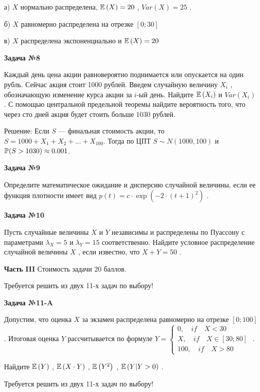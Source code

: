 \documentclass[12pt, a4paper]{article}\usepackage[]{graphicx}\usepackage[]{color}
\begin{document}
	а)  $X$  нормально распределена,  $\E\left(X\right)=20$ ,  $Var\left(X\right)=25$ .

	б)  $X$  равномерно распределена на отрезке  $\left[0;30\right]$

	в)  $X$  распределена экспоненциально и  $\E\left(X\right)=20$

	{\bf Задача №8}

	Каждый день цена акции равновероятно поднимается или опускается на один рубль. Сейчас акция стоит 1000 рублей. Введем случайную величину  $X_{i} $ , обозначающую изменение курса акции за  $i$-ый день. Найдите  $\E\left(X_{i} \right)$  и  $Var\left(X_{i} \right)$ . С помощью центральной предельной теоремы найдите вероятность того, что через сто дней акция будет стоить больше 1030 рублей.


	Решение: Если $S$ — финальная стоимость акции, то $S=1000+X_1+X_2+\ldots+X_{100}$. Тогда по ЦПТ $S\sim N(1000,100)$ и $\P(S>1030)\approx 0.001$.

	{\bf Задача №9}

	Определите математическое ожидание и дисперсию случайной величины, если ее функция плотности имеет вид  $p\left(t\right)=c\cdot \exp \left(-2\cdot \left(t+1\right)^{2} \right)$ .

	{\bf Задача №10}

	Пусть случайные величины  $X$  и  $Y$  независимы и распределены по Пуассону с параметрами  $\lambda _{X} =5$  и  $\lambda _{Y} =15$  соответственно. Найдите условное распределение случайной величины  $X$ , если известно, что  $X+Y=50$ .

	{\bf Часть }{\bf III} Стоимость задачи 20 баллов.

	Требуется решить {\bf {}} из двух 11-х задач по выбору!

	{\bf Задача №1}{\bf 1-}{\bf A}

	Допустим, что оценка  $X$  за экзамен распределена равномерно на отрезке  $\left[0;100\right]$ . Итоговая оценка  $Y$  рассчитывается по формуле  $Y=\left\{\begin{array}{l} {0,\quad if\quad X<30} \\ {X,\quad if\quad X\in \left[30;80\right]} \\ {100,\quad if\quad X>80} \end{array}\right. $ .

	Найдите  $\E\left(Y\right)$ ,  $\E\left(X\cdot Y\right)$ ,  $\E\left(Y^{2} \right)$ ,  $\E\left(Y|Y>0\right)$ .

	Требуется решить {\bf {}} из двух 11-х задач по выбору!
\end{document}
